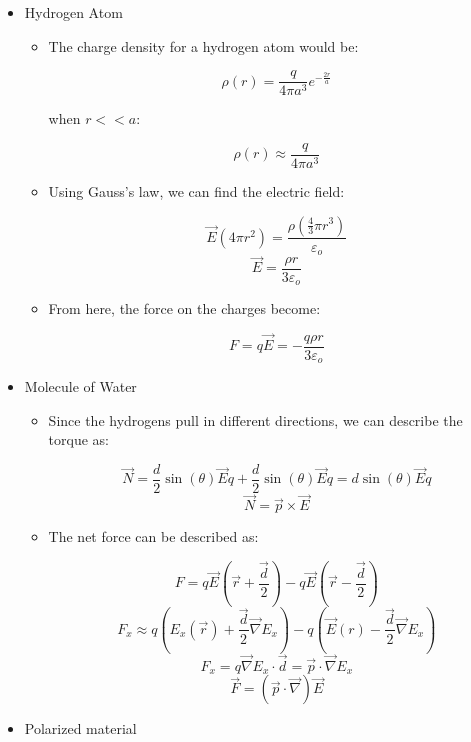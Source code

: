 \begin{itemize}

  \item Hydrogen Atom

    \begin{itemize}

      \item The charge density for a hydrogen atom would be:

        $$\rho(r)=\frac{q}{4\pi a^3}e^{-\frac{2r}{a}}$$

        when $r<<a$:

        $$\rho(r)\approx\frac{q}{4\pi a^3}$$

      \item Using Gauss's law, we can find the electric field:

        $$\vec{E}(4\pi r^2)=\frac{\rho(\frac{4}{3}\pi r^3)}{\varepsilon_o}$$
        $$\vec{E}=\frac{\rho r}{3\varepsilon_o}$$

      \item From here, the force on the charges become:

        $$F=q\vec{E}=-\frac{q\rho r}{3\varepsilon_o}$$

    \end{itemize}

  \item Molecule of Water

    \begin{itemize}

      \item Since the hydrogens pull in different directions, we can describe the torque as:

        $$\vec{N}=\frac{d}{2}\sin(\theta)\vec{E}q+\frac{d}{2}\sin(\theta)\vec{E}q=d\sin(\theta)\vec{E}q$$
        $$\vec{N}=\vec{p}\times\vec{E}$$

      \item The net force can be described as:

        $$F=q\vec{E}\left(\vec{r}+\frac{\vec{d}}{2}\right)-q\vec{E}\left( \vec{r}-\frac{\vec{d}}{2} \right)$$
        $$F_x\approx q\left( E_x(\vec{r})+\frac{\vec{d}}{2}\vec{\nabla}E_x \right)-q\left( \vec{E}(r)-\frac{\vec{d}}{2}\vec{\nabla} E_x \right)$$
        $$F_x=q\vec{\nabla}E_x\cdot\vec{d}=\vec{p}\cdot\vec{\nabla}E_x$$
        $$\vec{F}=(\vec{p}\cdot\vec{\nabla})\vec{E}$$

    \end{itemize}

  \item Polarized material


\end{itemize}
